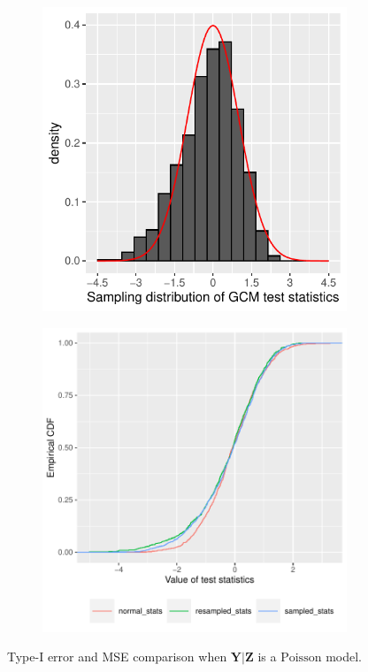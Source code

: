 \documentclass{article}
\begin{document}
\begin{figure}
    \begin{subfigure}{0.5\textwidth}
        \centering
        \includegraphics[width=\linewidth]{Figures/Q1/sampled-test-stats.pdf} \\ 
    \end{subfigure}%
    \begin{subfigure}{0.5\textwidth}
        \centering
        \includegraphics[width=\linewidth]{Figures/Q1/ecdf_comparison.pdf}
    \end{subfigure}
    \caption{Type-I error and MSE comparison when $\bm Y|\bm Z$ is a $\mathrm{Poisson}$ model.}
    \label{fig:dCRT_GCM_binomial_poisson} 
\end{figure}
\end{document}
